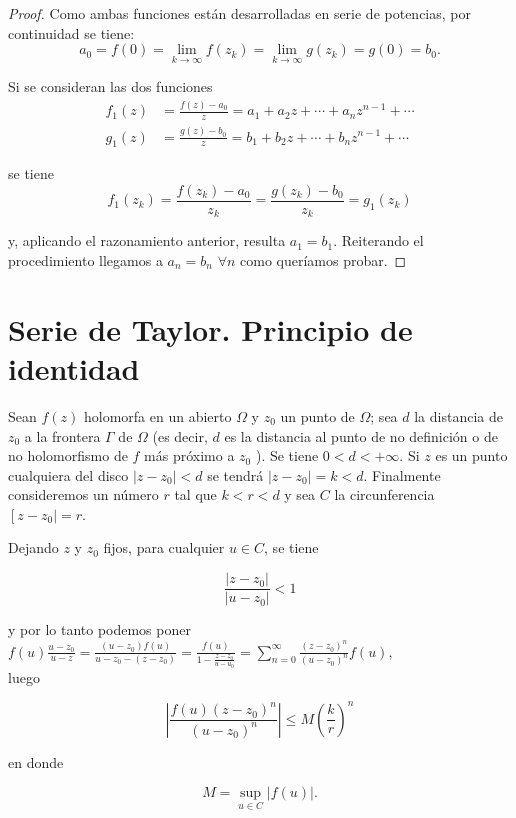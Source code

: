 \documentclass[10pt]{article}
\theoremstyle{plain}
\theoremstyle{definition}
\theoremstyle{remark}
\begin{document}
\begin{proof}
Como ambas funciones están desarrolladas en serie de potencias, por continuidad se tiene:
$$a_{0}=f(0)=\lim_{k \rightarrow \infty} f(z_{k})=\lim_{k \rightarrow \infty} g(z_{k})=g(0)=b_{0}.$$

Si se consideran las dos funciones
$$\begin{aligned}
f_{1}(z) &= \frac{f(z)-a_{0}}{z}=a_{1}+a_{2} z+\cdots+a_{n} z^{n-1}+\cdots \\
g_{1}(z) &= \frac{g(z)-b_{0}}{z}=b_{1}+b_{2} z+\cdots+b_{n} z^{n-1}+\cdots
\end{aligned}$$

se tiene
$$f_{1}(z_{k})=\frac{f(z_{k})-a_{0}}{z_{k}}=\frac{g(z_{k})-b_{0}}{z_{k}}=g_{1}(z_{k})$$

y, aplicando el razonamiento anterior, resulta $a_{1}=b_{1}$. Reiterando el procedimiento llegamos a $a_{n}=b_{n}$ $\forall n$ como queríamos probar.
\end{proof}

\section{Serie de Taylor. Principio de identidad}
Sean $f(z)$ holomorfa en un abierto $\Omega$ y $z_{0}$ un punto de $\Omega$; sea $d$ la distancia de $z_{0}$ a la frontera $\Gamma$ de $\Omega$ (es decir, $d$ es la distancia al punto de no definición o de no holomorfismo de $f$ más próximo a $z_{0}$ ). Se tiene $0<d<+\infty$. Si $z$ es un punto cualquiera del disco $\left|z-z_{0}\right|<d$ se tendrá $\left|z-z_{0}\right|=k<d$. Finalmente consideremos un número $r$ tal que $k<r<d$ y sea $C$ la circunferencia $\left[z-z_{0} \mid=r\right.$.

Dejando $z$ y $z_{0}$ fijos, para cualquier $u \in C$, se tiene

$$
\frac{\left|z-z_{0}\right|}{\left|u-z_{0}\right|}<1
$$

y por lo tanto podemos poner\\
$f(u) \frac{u-z_{0}}{u-z}=\frac{\left(u-z_{0}\right) f(u)}{u-z_{0}-\left(z-z_{0}\right)}=\frac{f(u)}{1-\frac{z-z_{0}}{u-u_{0}}}=\sum_{n=0}^{\infty} \frac{\left(z-z_{0}\right)^{n}}{\left(u-z_{0}\right)^{n}} f(u)$,\\
luego

$$
\left|\frac{f(u)\left(z-z_{0}\right)^{n}}{\left(u-z_{0}\right)^{n}}\right| \leqslant M\left(\frac{k}{r}\right)^{n}
$$

en donde

$$
M=\sup _{u \in C}|f(u)| .
$$
\end{document}
